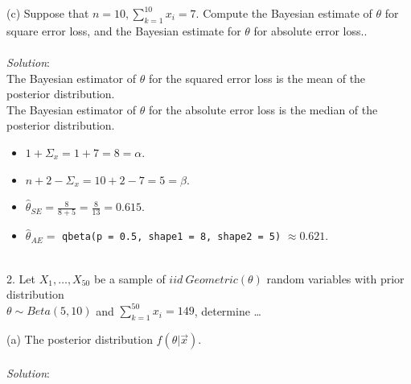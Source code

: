 \documentclass[12pt]{article}
\newcommand{\XB}{\color{black}}
\newcommand{\XBB}{\color{blue}}
\newcommand{\ds}{\displaystyle}
\begin{document}
\vspace{2.5mm}

(c) Suppose that $ n = 10, \sum_{k=1}^{10} x_{i} = 7 $. Compute the Bayesian estimate of $ \theta $ 
for square error loss, and the Bayesian estimate for $ \theta $ for absolute error loss.. \\
\vspace{2.5mm} \\
\textit{Solution}:
\vspace{2.5mm} \\

\noindent
The Bayesian estimator of $ \theta $ for the squared error loss is the mean of the posterior distribution. \\
\noindent
The Bayesian estimator of $ \theta $ for the absolute error loss is the median of the posterior distribution. \\

\begin{itemize}
    \item $ \ds 1 + \Sigma_{x} = 1 + 7 = 8 = \alpha $.
    \item $ \ds n + 2 - \Sigma_{x} = 10 + 2 - 7 = 5 = \beta $.
    \item $ \ds \hat{\theta}_{SE} = \frac{8}{8 + 5} = \frac{8}{13} = 0.615 $.
    \item $ \ds \hat{\theta}_{AE} = $ {\XBB \texttt{qbeta(p = 0.5, shape1 = 8, shape2 = 5)}} $ \approx 0.621 $.
\end{itemize}

\vspace{2.5mm}

\newpage
\XBB\hrulefill\XB \\

2.  Let $ X_{1}, \dots , X_{50} $ be a sample of $ iid \ Geometric(\theta) $ random variables
with prior distribution \\ $ \theta \sim Beta(5, 10) $ and $\sum_{k=1}^{50} x_{i} = 149 $, determine \dots \\ 

\XBB\hrulefill\XB 
\vspace{5mm} 

(a) The posterior distribution $ f(\theta | \overrightarrow{x}) $. \\
\vspace{2.5mm} \\
\textit{Solution}:
\vspace{2.5mm} \\
\end{document}
